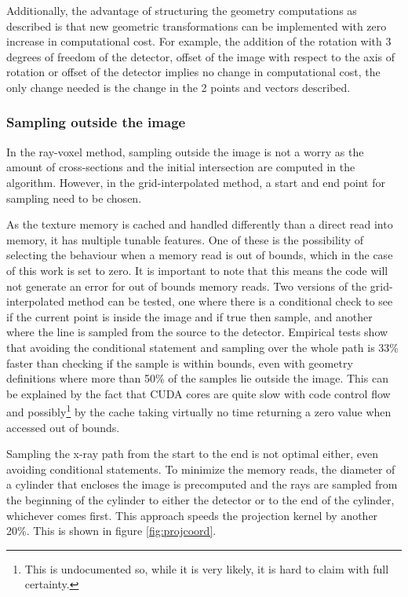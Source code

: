 Additionally, the advantage of structuring the geometry computations as described is that new geometric transformations can be implemented with zero increase in computational cost. For example, the addition of the rotation with 3 degrees of freedom of the detector, offset of the image with respect to the axis of rotation or offset of the detector implies no change in computational cost, the only change needed is the change in the 2 points and vectors described.
 
\subsubsection{Sampling outside the image}

In the ray-voxel method, sampling outside the image is not a worry as the amount of cross-sections and the initial intersection are computed in the algorithm. However, in the grid-interpolated method, a start and end point for sampling need to be chosen. 

As the texture memory is cached and handled differently than a direct read into memory, it has multiple tunable features. One of these is the possibility of selecting the behaviour when a memory read is out of bounds, which in the case of this work is set to zero. It is important to note that this means the code will not generate an error for out of bounds memory reads. Two versions of the grid-interpolated method can be tested, one where there is a conditional check to see if the current point is inside the image and if true then sample, and another where the line is sampled from the source to the detector. Empirical tests show that avoiding the conditional statement and sampling over the whole path is 33\% faster than checking if the sample is within bounds, even with geometry definitions where more than 50\% of the samples lie outside the image. This can be explained by the fact that CUDA cores are quite slow with code control flow and possibly\footnote{This is undocumented so, while it is very likely, it is hard to claim with full certainty.} by the cache taking virtually no time returning a zero value when accessed out of bounds. 

Sampling the x-ray path from the start to the end is not optimal either, even avoiding conditional statements. To minimize the memory reads, the diameter of a cylinder that encloses the image is precomputed and the rays are sampled from the beginning of the cylinder to either the detector or to the end of the cylinder, whichever comes first. This approach speeds the projection kernel by another 20\%. This is shown in figure \ref{fig:projcoord}.

